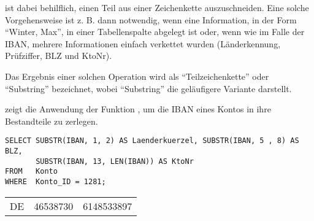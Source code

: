  ist dabei behilflich, einen Teil aus einer Zeichenkette auszuschneiden. Eine solche Vorgehensweise ist z. B. dann notwendig, wenn eine Information, in der Form \enquote{Winter, Max}, in einer Tabellenspalte abgelegt ist oder, wenn wie im Falle der IBAN, mehrere Informationen einfach verkettet wurden (Länderkennung, Prüfziffer, BLZ und KtoNr).
\begin{merke}
    Das Ergebnis einer solchen Operation wird als \enquote{Teilzeichenkette} oder \enquote{Substring} bezeichnet, wobei \enquote{Substring} die geläufigere Variante darstellt.
\end{merke}
 zeigt die Anwendung der Funktion , um die IBAN eines Kontos in ihre Bestandteile zu zerlegen.
\begin{lstlisting}[language=oracle_sql,caption={Die Anwendung der Funktion \languageorasql{SUBSTR}},label=sql03_05]
SELECT SUBSTR(IBAN, 1, 2) AS Laenderkuerzel, SUBSTR(IBAN, 5 , 8) AS BLZ,
       SUBSTR(IBAN, 13, LEN(IBAN)) AS KtoNr
FROM   Konto
WHERE  Konto_ID = 1281;
          \end{lstlisting}
\begin{center}
    \begin{small}
        \tablehead{}
        \begin{oraclesql}
            \begin{supertabular}{lrr}
                DE & 46538730 & 6148533897 \\
            \end{supertabular}
        \end{oraclesql}
    \end{small}
\end{center}
\clearpage
